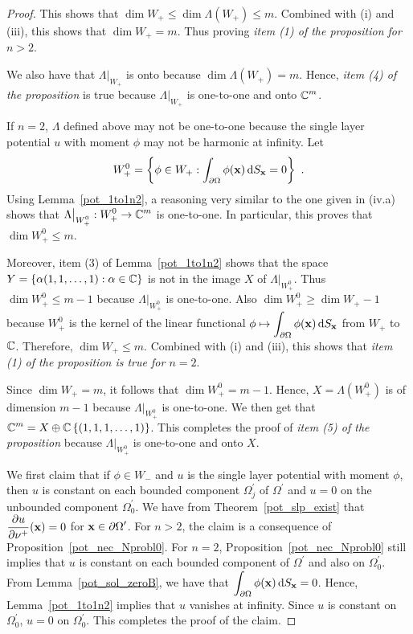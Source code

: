 \begin{proof}
This shows that $\dim W_+ \leq \dim \Lambda(W_+) \leq m$.  Combined
with (i) and (iii), this shows that $\dim W_+ = m$.  Thus proving
{\em item (1) of the proposition for $n>2$}.

We also have that $\displaystyle \Lambda\big|_{W_+}$ is onto because
$\dim \Lambda(W_+) = m$.  Hence, {\em item (4) of the proposition} is
true because $\displaystyle \Lambda\big|_{W_+}$ is one-to-one and onto
$\displaystyle \mathbb{C}^m$.

  If $n=2$, $\Lambda$ defined above may not be one-to-one
because the single layer potential $u$ with moment $\phi$ may not be
harmonic at infinity.  Let
\[
W_+^0 = \left\{ \phi \in W_+ : \int_{\partial \Omega} \phi(\mathbf{x})
\,\mathrm{d}{S}_{\mathbf{x}} = 0 \right\} \ .
\]
Using Lemma~\ref{pot_1to1n2}, a reasoning very similar to the one
given in (iv.a) shows that
$\displaystyle \Lambda\big|_{W_+^0} : W_+^0 \rightarrow \mathbb{C}^m$ is
one-to-one.  In particular, this proves that $\displaystyle \dim W_+^0 \leq m$.

Moreover, item (3) of Lemma~\ref{pot_1to1n2} shows that the space
$\displaystyle Y = \left\{ \alpha (1,1,\ldots,1) : \alpha \in \mathbb{C} \right\}$
is not in the image $X$ of $\Lambda\big|_{W_+^0}$.
Thus $\displaystyle \dim W_+^0 \leq m-1$ because
$\Lambda\big|_{W_+^0}$ is one-to-one.
Also $\displaystyle \dim W_+^0 \geq \dim W_+ - 1$ because
$\displaystyle W_+^0$ is the kernel of the
linear functional
$\displaystyle \phi \mapsto \int_{\partial \Omega} \phi(\mathbf{x}) \,\mathrm{d}{S}_{\mathbf{x}}$
from $W_+$ to $\mathbb{C}$.
Therefore, $\dim W_+ \leq m$.  Combined with (i) and (iii), this shows
that {\em item (1) of the proposition is true for $n=2$}.

Since $\dim W_+ = m$, it follows that $\displaystyle \dim W_+^0 = m - 1$.
Hence, $\displaystyle X = \Lambda(W_+^0)$ is of dimension $m-1$ because
$\displaystyle \Lambda\big|_{W_+^0}$ is one-to-one.
We then get that
$\displaystyle \mathbb{C}^m = X \oplus \mathbb{C}\left\{(1,1,1,\ldots,1)\right\}$.
This completes the proof of {\em item (5) of the proposition} because
$\displaystyle \Lambda\big|_{W_+^0}$ is one-to-one and onto $X$.

We first claim that if $\phi \in W_-$ and $u$ is the single layer
potential with moment $\phi$, then $u$ is constant on each bounded
component $\displaystyle \Omega_j^{\prime}$ of
$\displaystyle \Omega^{\prime}$ and $u=0$ on the unbounded
component $\displaystyle \Omega_0^{\prime}$.  We have from
Theorem~\ref{pot_slp_exist}
that $\displaystyle \frac{\partial{u}}{\partial \mathbf{\nu}^+}(\mathbf{x}) = 0$
for $\displaystyle \mathbf{x} \in \partial \Omega^{\prime}$.  For $n>2$,
the claim is a consequence of Proposition~\ref{pot_nec_Nprobl0}.  For $n=2$,
Proposition~\ref{pot_nec_Nprobl0} still implies that $u$ is constant
on each bounded component of $\displaystyle \Omega^{\prime}$ and also
on $\displaystyle \Omega_0^{\prime}$.
From Lemma~\ref{pot_sol_zeroB}, we have that
$\displaystyle \int_{\partial \Omega} \phi(\mathbf{x}) \,\mathrm{d}{S}_{\mathbf{x}} = 0$.
Hence, Lemma~\ref{pot_1to1n2} implies that $u$ vanishes at infinity.  Since
$u$ is constant on $\displaystyle \Omega_0^{\prime}$, $u=0$ on
$\displaystyle \Omega_0^{\prime}$.
This completes the proof of the claim.


\end{proof}
